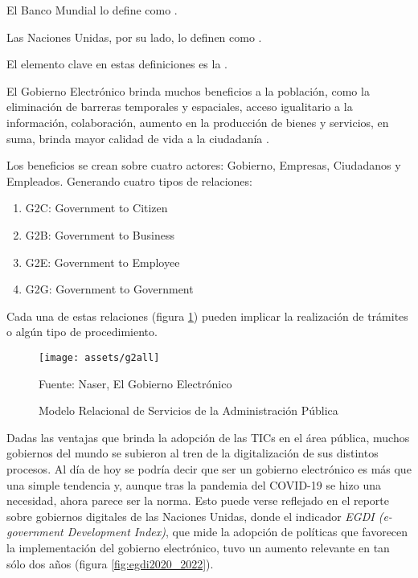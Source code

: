 El Banco Mundial lo define como
.

Las Naciones Unidas, por su lado, lo definen como 
.

El elemento clave en estas definiciones es la \cite{naserGobiernoElectronicoGestion2011}.


El Gobierno Electrónico brinda muchos beneficios a la población, como 
la eliminación de barreras temporales y espaciales, 
acceso igualitario a la información, colaboración, aumento en la producción de bienes y servicios, 
en suma, brinda mayor calidad de vida a la ciudadanía \cite[16]{naserGobiernoElectronicoGestion2011}.

Los beneficios se crean sobre cuatro actores: Gobierno, Empresas, Ciudadanos y Empleados. Generando cuatro tipos de relaciones:

\begin{enumerate}
    \item G2C: Government to Citizen
    \item G2B: Government to Business
    \item G2E: Government to Employee
    \item G2G: Government to Government
\end{enumerate}

Cada una de estas relaciones (figura \ref{fig:g2all}) pueden implicar la realización de trámites o algún tipo de procedimiento.

\begin{figure}[!htpb]
    \centering
    \texttt{[image: assets/g2all]}
    \caption{Modelo Relacional de Servicios de la Administración Pública}{Fuente: Naser, El Gobierno Electrónico}
    \label{fig:g2all}
\end{figure}

Dadas las ventajas que brinda la adopción de las TICs en el área pública, muchos gobiernos del mundo se subieron al tren de la digitalización de sus distintos procesos. 
Al día de hoy se podría decir que ser un gobierno electrónico es más que una simple tendencia y, aunque tras la pandemia del COVID-19 se hizo una necesidad, ahora parece ser la norma. 
Esto puede verse reflejado en el reporte sobre gobiernos digitales de las Naciones Unidas, 
donde el indicador \textit{EGDI (e-government Development Index)}, que mide la adopción de políticas que favorecen la implementación del gobierno electrónico, 
tuvo un aumento relevante en tan sólo dos años (figura \ref{fig:egdi2020_2022}).

